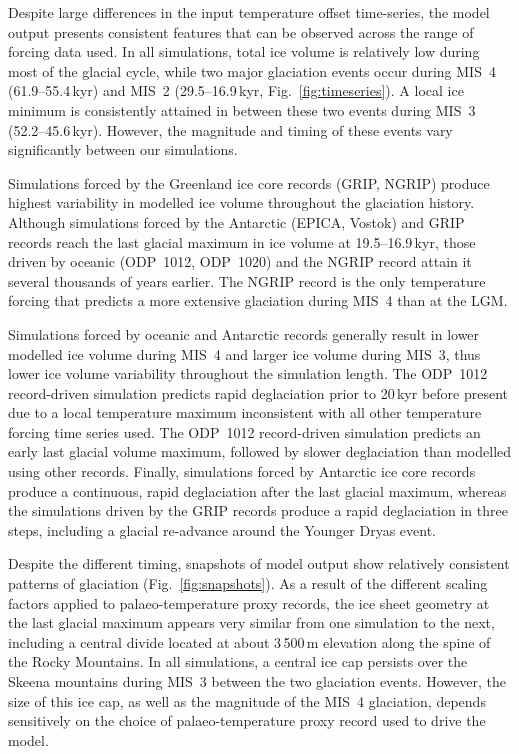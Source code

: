 \documentclass[tc, ms]{copernicus}
\begin{document}
Despite large differences in the input temperature offset time-series, the
model output presents consistent features that can be observed across the range
of forcing data used. In all simulations, total ice volume is relatively low
during most of the glacial cycle, while two major glaciation events occur
during MIS~4 (61.9--55.4\,\unit{kyr}) and MIS~2 (29.5--16.9\,\unit{kyr},
Fig.~\ref{fig:timeseries}). A local ice minimum is consistently attained in
between these two events during MIS~3 (52.2--45.6\,\unit{kyr}).
However, the magnitude and timing of these events vary significantly
between our simulations.

Simulations forced by the Greenland ice core records (GRIP, NGRIP) produce
highest variability in modelled ice volume throughout the glaciation history.
Although simulations forced by the Antarctic (EPICA, Vostok) and GRIP records
reach the last glacial maximum in ice volume at 19.5--16.9\,\unit{kyr}, those
driven by oceanic (ODP~1012, ODP~1020) and the NGRIP record attain it several
thousands of years earlier. The NGRIP record is the only temperature forcing
that predicts a more extensive glaciation during MIS~4 than at the LGM.

Simulations forced by oceanic and Antarctic records generally result in lower
modelled ice volume during MIS~4 and larger ice volume during MIS~3, thus lower
ice volume variability throughout the simulation length. The ODP~1012
record-driven simulation predicts rapid deglaciation prior to 20\,\unit{kyr}
before present due to a local temperature maximum inconsistent with all other
temperature forcing time series used. The ODP~1012 record-driven simulation
predicts an early last glacial volume maximum, followed by slower deglaciation
than modelled using other records. Finally, simulations forced by Antarctic ice
core records produce a continuous, rapid deglaciation after the last glacial
maximum, whereas the simulations driven by the GRIP records produce a rapid
deglaciation in three steps, including a glacial re-advance around the Younger
Dryas event.

Despite the different timing, snapshots of model output show relatively
consistent patterns of glaciation (Fig.~\ref{fig:snapshots}). As a result of
the different scaling factors applied to palaeo-temperature proxy records, the
ice sheet geometry at the last glacial maximum appears very similar from one
simulation to the next, including a central divide located at about
3\,500\,\unit{m} elevation along the spine of the Rocky Mountains. In all
simulations, a central ice cap persists over the Skeena mountains during MIS~3
between the two glaciation events. However, the size of this ice cap, as well
as the magnitude of the MIS~4 glaciation, depends sensitively on the choice of
palaeo-temperature proxy record used to drive the model.
\end{document}
